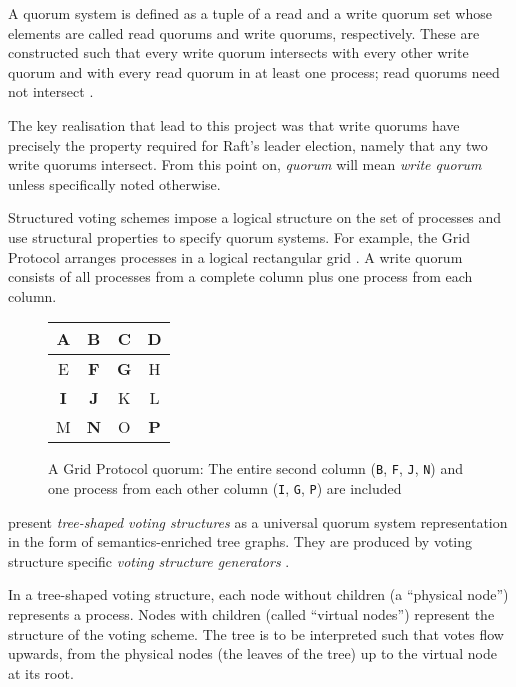 \documentclass[11pt,chapterprefix=true,toc=bibliography,numbers=noendperiod,
               footnotes=multiple,twoside]{scrreprt}
\newcommand{\voted}[1]{\textbf{\color{black}#1}}
\begin{document}
A quorum system is defined as a tuple of a read and a write quorum set whose elements are called read quorums and write quorums, respectively. These are constructed such that every write quorum intersects with every other write quorum and with every read quorum in at least one process; read quorums need not intersect \autocite{voting}.

The key realisation that lead to this project was that write quorums have precisely the property required for Raft's leader election, namely that any two write quorums intersect. From this point on, \emph{quorum} will mean \emph{write quorum} unless specifically noted otherwise.


Structured voting schemes impose a logical structure on the set of processes and use structural properties to specify quorum systems. For example, the Grid Protocol arranges processes in a logical rectangular grid \autocite{grid}. A write quorum consists of all processes from a complete column plus one process from each column.

\begin{figure}[h]
    \centering
    {\ttfamily\color{gray}
    \begin{tabular}{c | c | c | c}
        A & \voted{B} & C & D \\
        \hline
        E & \voted{F} & \voted{G} & H \\
        \hline
        \voted{I} & \voted{J} & K & L \\
        \hline
        M & \voted{N} & O & \voted{P} \\
    \end{tabular}
    }
    \caption[Grid protocol quorum table]{A Grid Protocol quorum: The entire second column (\texttt{B}, \texttt{F}, \texttt{J}, \texttt{N}) and one process from each other column (\texttt{I}, \texttt{G}, \texttt{P}) are included}
    \label{fig:grid-quorum}
\end{figure}


\citeauthor{generators} present \emph{tree-shaped voting structures} as a universal quorum system representation in the form of semantics-enriched tree graphs. They are produced by voting structure specific \emph{voting structure generators} \autocite{generators}.

In a tree-shaped voting structure, each node without children (a \enquote{physical node}) represents a process. Nodes with children (called \enquote{virtual nodes}) represent the structure of the voting scheme. The tree is to be interpreted such that votes flow upwards, from the physical nodes (the leaves of the tree) up to the virtual node at its root.
\end{document}
